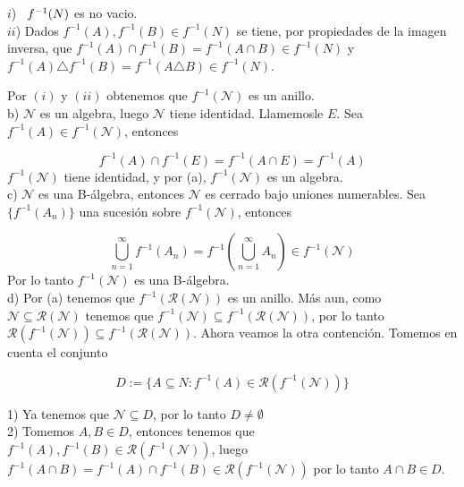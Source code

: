 \documentclass[12pt]{article}
\begin{document}
    $i$) $\hspace*{5pt}f^{-1}(N)$ es no vacio.
    \\

    $ii$) Dados $f^{-1}(A),f^{-1}(B)\in f^{-1}(N)$ se tiene, por propiedades de la imagen 
    inversa, que \hspace*{31pt} $f^{-1}(A)\cap f^{-1}(B) = f^{-1}(A\cap B) \in f^{-1}(N)$ y 
    $f^{-1}(A)\triangle f^{-1}(B) = f^{-1}(A\triangle B) \in f^{-1}(N)$.
    \newpage

    \noindent Por $(i)$ y $(ii)$ obtenemos que $f^{-1} (\mathcal{N})$ es un anillo.
    \\

    b) $\mathcal{N}$ es un algebra, luego $\mathcal{N}$ tiene identidad. Llamemosle $E$.
    Sea $f^{-1}(A)\in f^{-1}(\mathcal{N})$, entonces

    \[f^{-1}(A)\cap f^{-1}(E) = f^{-1}(A\cap E) = f^{-1}(A)\]
    $f^{-1}(\mathcal{N})$ tiene identidad, y por (a), $f^{-1}(\mathcal{N})$ es un algebra.
    \\

    c) $\mathcal{N}$ es una B-\'algebra, entonces $\mathcal{N}$ es cerrado bajo uniones 
    numerables. Sea $\{f^{-1}(A_n)\}$ una sucesi\'on sobre $f^{-1}(\mathcal{N})$, entonces

    \[\bigcup_{n=1}^{\infty}f^{-1}(A_n) = f^{-1}\left(\bigcup_{n=1}^{\infty}A_n\right)\in f^{-1}(\mathcal{N})\]
    Por lo tanto $f^{-1}(\mathcal{N})$ es una B-\'algebra.
    \\

    d) Por (a) tenemos que $f^{-1}(\mathscr{R}(\mathcal{N}))$ es un anillo. M\'as aun, 
    como $\mathcal{N}\subseteq \mathscr{R}(\mathcal{N})$ tenemos que 
    $f^{-1}(\mathcal{N})\subseteq f^{-1}(\mathscr{R}(\mathcal{N}))$, por lo tanto
    $\mathscr{R}(f^{-1}(\mathcal{N}))\subseteq f^{-1}(\mathscr{R}(\mathcal{N}))$.
    Ahora veamos la otra contenci\'on. Tomemos en cuenta el conjunto 

    \[D := \{A \subseteq N : f^{-1}(A)\in \mathscr{R}(f^{-1}(\mathcal{N}))\}\]

    1) Ya tenemos que $\mathcal{N} \subseteq D$, por lo tanto $D \neq \emptyset$
    \\

    2) Tomemos $A,B\in D$, entonces tenemos que $f^{-1}(A), f^{-1}(B)\in \mathscr{R}(f^{-1}(\mathcal{N}))$,
    luego \hspace*{32pt}$f^{-1}(A\cap B) = f^{-1}(A)\cap f^{-1}(B)\in \mathscr{R}(f^{-1}(\mathcal{N}))$ por
    lo tanto $A\cap B\in D$.
    \\
\end{document}

